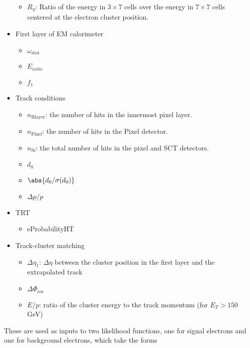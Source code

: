 \begin{itemize}
\begin{itemize}
		      \item $R_{\eta}$: Ratio of the energy in $3\times 7$ cells over the energy in $7\times 7$ cells
		            centered at the electron cluster position.
	      \end{itemize}
	\item First layer of EM calorimeter
	      \begin{itemize}
		      \item $\omega_{\text{stot}}$
		      \item $E_{\text{ratio}}$
		      \item $f_1$
	      \end{itemize}
	\item Track conditions
	      \begin{itemize}
		      \item $n_{\text{Blayer}}$: the number of hits in the innermost pixel layer.
		      \item $n_{\text{Pixel}}$: the number of hits in the Pixel detector.
		      \item $n_{\text{Si}}$: the total number of hits in the pixel and SCT detectors.
		      \item $d_0$
		      \item $\abs{d_0/ \sigma(d_0)}$
		      \item $\Delta p / p$
	      \end{itemize}
	\item TRT
	      \begin{itemize}
		      \item eProbabilityHT
	      \end{itemize}
	\item Track-cluster matching
	      \begin{itemize}

		      \item $\Delta\eta_1$: $\Delta \eta$ between the cluster position in the
		            first layer and the extrapolated track

		      \item $\Delta \Phi_{\text{res}}$

		      \item $E/p$: ratio of the cluster energy to the track momentum (for $E_T > 150$ GeV)
	      \end{itemize}
\end{itemize}

These are used as inputs to two likelihood functions, one for signal electrons
and one for background electrons, which take the forms


